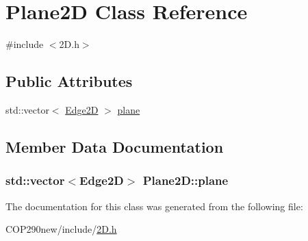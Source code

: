 \hypertarget{class_plane2_d}{}\section{Plane2D Class Reference}
\label{class_plane2_d}


{\ttfamily \#include $<$2\+D.\+h$>$}

\subsection*{Public Attributes}
\begin{DoxyCompactItemize}
\item 
std\+::vector$<$ \hyperlink{class_edge2_d}{Edge2D} $>$ \hyperlink{class_plane2_d_a03d152b6cf4f523d12204883566ead7d}{plane}
\end{DoxyCompactItemize}


\subsection{Member Data Documentation}
\subsubsection[{\texorpdfstring{plane}{plane}}]{\setlength{\rightskip}{0pt plus 5cm}std\+::vector$<${\bf Edge2D}$>$ Plane2\+D\+::plane}\hypertarget{class_plane2_d_a03d152b6cf4f523d12204883566ead7d}{}\label{class_plane2_d_a03d152b6cf4f523d12204883566ead7d}


The documentation for this class was generated from the following file\+:\begin{DoxyCompactItemize}
\item 
C\+O\+P290new/include/\hyperlink{2_d_8h}{2\+D.\+h}\end{DoxyCompactItemize}
